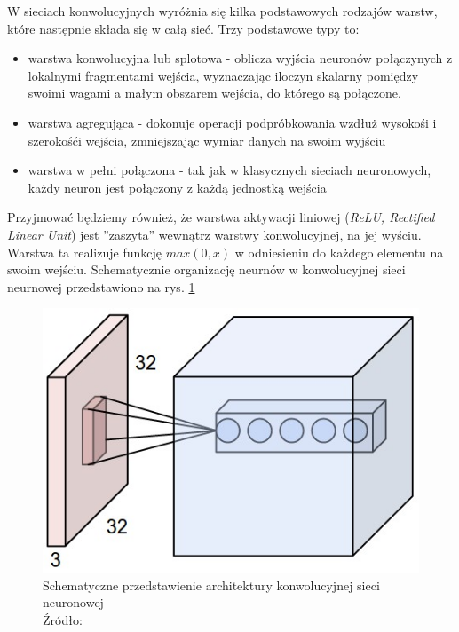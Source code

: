 W sieciach konwolucyjnych wyróżnia się kilka podstawowych rodzajów warstw, które następnie składa się w całą sieć.
Trzy podstawowe typy to:
\begin{itemize}
	\item warstwa konwolucyjna lub splotowa - oblicza wyjścia neuronów połączynych z lokalnymi fragmentami wejścia, wyznaczając iloczyn skalarny pomiędzy swoimi wagami a małym obszarem wejścia, do którego są połączone.
	\item warstwa agregująca - dokonuje operacji podpróbkowania wzdłuż wysokośi i szerokośći wejścia, zmniejszając wymiar danych na swoim wyjściu
	\item warstwa w pełni połączona - tak jak w klasycznych sieciach neuronowych, każdy neuron jest połączony z każdą jednostką wejścia
\end{itemize}

Przyjmować będziemy również, że warstwa aktywacji liniowej (\textit{ReLU, Rectified Linear Unit}) jest ''zaszyta'' wewnątrz warstwy konwolucyjnej, na jej wyściu.
Warstwa ta realizuje funkcję $max(0, x)$ w odniesieniu do każdego elementu na swoim wejściu. \cite{cs231n}
Schematycznie organizację neurnów w konwolucyjnej sieci neurnowej przedstawiono na rys. \ref{fig:cnn}

\begin{figure}[h!tb]
	 \centering
	 \includegraphics[width = 1.0\linewidth]{img/cnn}
	 \caption{Schematyczne przedstawienie architektury konwolucyjnej sieci neuronowej \\
              Źródło: \cite{cs231n}}
	 \label{fig:cnn}
\end{figure}

